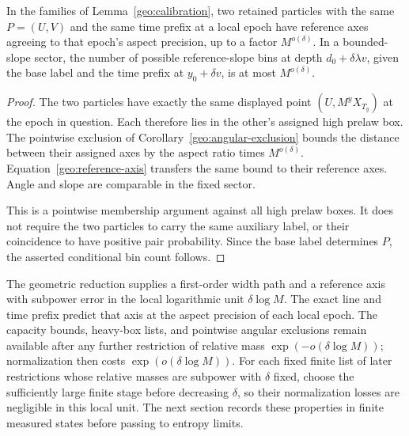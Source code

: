 \begin{corollary}\label{geo:axis-prediction}
In the families of Lemma~\ref{geo:calibration}, two
retained particles with the same \(P=(U,V)\) and the
same time prefix at a local epoch have reference
axes agreeing to that epoch's aspect precision,
up to a factor \(M^{o(\delta)}\).
In a bounded-slope sector, the number of possible
reference-slope bins at depth
\(d_0+\delta\lambda v\), given the base label and
the time prefix at \(y_0+\delta v\), is at most
\(M^{o(\delta)}\).
\end{corollary}

\begin{proof}
The two particles have exactly the same displayed
point \((U,M^yX_{T_y})\) at the epoch in question.
Each therefore lies in the other's assigned high
prelaw box.  The pointwise exclusion of
Corollary~\ref{geo:angular-exclusion} bounds the
distance between their assigned axes by the
aspect ratio times \(M^{o(\delta)}\).
Equation~\eqref{geo:reference-axis} transfers the
same bound to their reference axes.  Angle and
slope are comparable in the fixed sector.

This is a pointwise membership argument against
all high prelaw boxes.  It does not require the
two particles to carry the same auxiliary label,
or their coincidence to have positive pair
probability.  Since the base label determines
\(P\), the asserted conditional bin count follows.
\end{proof}

The geometric reduction supplies a first-order width path and a
reference axis with subpower error in the local logarithmic unit
\(\delta\log M\).  The exact line and time prefix predict that axis
at the aspect precision of each local epoch.  The capacity bounds,
heavy-box lists, and pointwise angular exclusions remain available
after any further restriction of relative mass
\(\exp(-o(\delta\log M))\); normalization then costs
\(\exp(o(\delta\log M))\).  For each fixed finite list of later
restrictions whose relative masses are subpower with \(\delta\)
fixed, choose the sufficiently large finite stage before decreasing
\(\delta\), so their normalization losses are negligible in this
local unit.
The next section records these properties in finite measured states
before passing to entropy limits.
